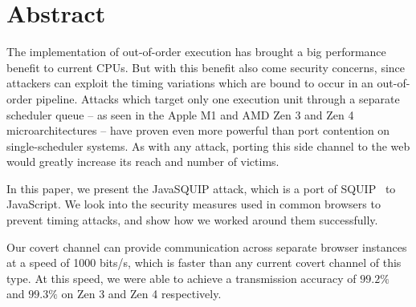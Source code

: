 \documentclass[11pt,
  titlepage=false,
]{scrreprt}
\begin{document}







\printthesistitle

\chapter*{\centering\Large Abstract}
\label{ch:abstract}
The implementation of out-of-order execution has brought a big performance benefit to current CPUs.
But with this benefit also come security concerns, since attackers can exploit the timing variations which are bound to occur in an out-of-order pipeline.
Attacks which target only one execution unit through a separate scheduler queue -- as seen in the Apple M1 and AMD Zen 3 and Zen 4 microarchitectures -- have proven even more powerful than port contention on single-scheduler systems.
As with any attack, porting this side channel to the web would greatly increase its reach and number of victims.

In this paper, we present the JavaSQUIP attack, which is a port of SQUIP~\cite{squip} to JavaScript.
We look into the security measures used in common browsers to prevent timing attacks, and show how we worked around them successfully.

Our covert channel can provide communication across separate browser instances at a speed of 1000 bits/s,
which is faster than any current covert channel of this type.
At this speed, we were able to achieve a transmission accuracy of $99.2\%$ and $99.3\%$ on Zen 3 and Zen 4 respectively.
\end{document}
